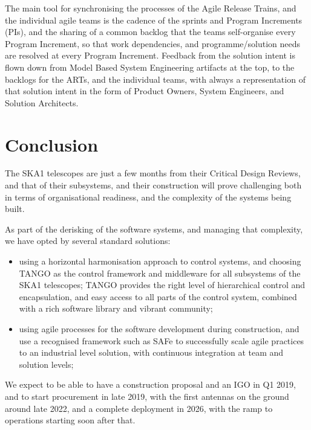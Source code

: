 \documentclass[a4paper,
               biblatex,       %
               keeplastbox,    %
               ]{jacow-2_1}    %
\begin{document}
The main tool for synchronising the processes of the Agile Release Trains, and the individual agile teams is the cadence of the sprints and Program Increments (PIs), and the sharing of a common backlog that the teams self-organise every Program Increment, so that work dependencies, and programme/solution needs are resolved at every Program Increment. Feedback from the solution intent is flown down from Model Based System Engineering artifacts at the top, to the backlogs for the ARTs, and the individual teams, with always a representation of that solution intent in the form of Product Owners, System Engineers, and Solution Architects.



\section{Conclusion} %
\label{sec:conclusion}
The SKA1 telescopes are just a few months from their Critical Design Reviews, and that of their subsystems, and their construction will prove challenging both in terms of organisational readiness, and the complexity of the systems being built.

As part of the derisking of the software systems, and managing that complexity, we have opted by several standard solutions:

\begin{itemize}
	\item using a horizontal harmonisation approach to control systems, and choosing TANGO as the control framework and middleware for all subsystems of the SKA1 telescopes; TANGO provides the right level of hierarchical control and encapsulation, and easy access to all parts of the control system, combined with a rich software library and vibrant community;
	\item using agile processes for the software development during construction, and use a recognised framework such as SAFe to successfully scale agile practices to an industrial level solution, with continuous integration at team and solution levels;
\end{itemize}

We expect to be able to have a construction proposal and an IGO in Q1 2019, and to start procurement in late 2019, with the first antennas on the ground around late 2022, and a complete deployment in 2026, with the ramp to operations starting soon after that.

\end{document}
